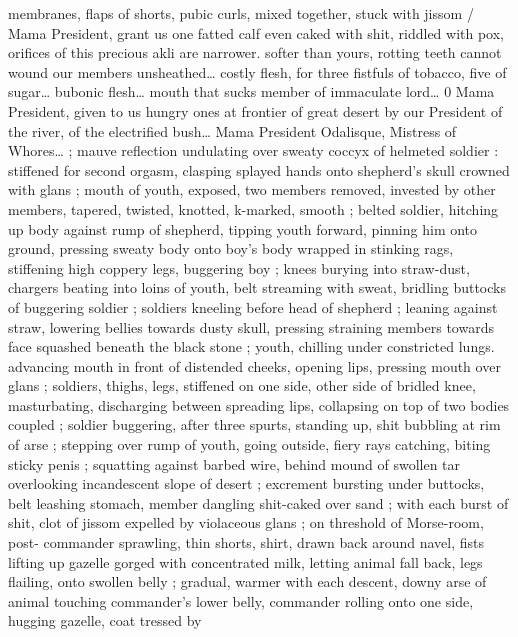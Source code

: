 membranes, flaps of shorts, pubic curls, mixed together, stuck with 
jissom {\slash} {\td} {\gl} Mama President, grant us one fatted calf{\td} even caked 
with shit, riddled with pox, orifices of this precious akli are narrower. 
softer than yours, rotting teeth cannot wound our members 
unsheathed{\ldots} costly flesh, for three fistfuls of tobacco, five of 
sugar{\ldots} bubonic flesh{\ldots} mouth that sucks member of immaculate 
lord{\ldots} 0 Mama President, given to us hungry ones at frontier of great 
desert by our President of the river, of the electrified bush{\ldots} Mama 
President Odalisque, Mistress of Whores{\ldots}{\gr} ; mauve reflection 
undulating over sweaty coccyx of helmeted soldier : stiffened for 
second orgasm, clasping splayed hands onto shepherd's skull 
crowned with glans ; mouth of youth, exposed, two members 
removed, invested by other members, tapered, twisted, knotted, 
k-marked, smooth ; belted soldier, hitching up body against rump 
of shepherd, tipping youth forward, pinning him onto ground, 
pressing sweaty body onto boy's body wrapped in stinking rags, 
stiffening high coppery legs, buggering boy ; knees burying into 
straw-dust, chargers beating into loins of youth, belt streaming with 
sweat, bridling buttocks of buggering soldier ; soldiers kneeling 
before head of shepherd ; leaning against straw, lowering bellies 
towards dusty skull, pressing straining members towards face 
squashed beneath the black stone ; youth, chilling under constricted 
lungs. advancing mouth in front of distended cheeks, opening lips, 
pressing mouth over glans ; soldiers, thighs, legs, stiffened on one 
side, other side of bridled knee, masturbating, discharging between 
spreading lips, collapsing on top of two bodies coupled ; soldier 
buggering, after three spurts, standing up, shit bubbling at rim of 
arse ; stepping over rump of youth, going outside, fiery rays 
catching, biting sticky penis ; squatting against barbed wire, behind 
mound of swollen tar overlooking incandescent slope of desert ; 
excrement bursting under buttocks, belt leashing stomach, member 
dangling shit-caked over sand ; with each burst of shit, clot of jissom 
expelled by violaceous glans ; on threshold of Morse-room, post- 
commander sprawling, thin shorts, shirt, drawn back around navel, 
fists lifting up gazelle gorged with concentrated milk, letting animal 
fall back, legs flailing, onto swollen belly ; gradual, warmer with each 
descent, downy arse of animal touching commander's lower belly, 
commander rolling onto one side, hugging gazelle, coat tressed by 

